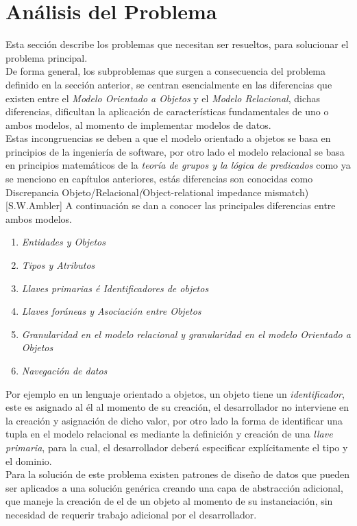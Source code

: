 \section{Análisis del Problema}
\noindent Esta sección describe los problemas que necesitan ser resueltos, para solucionar el problema principal.\\
\indent De forma general, los subproblemas que surgen a consecuencia del problema definido en la sección anterior,
\noindent se centran esencialmente en las diferencias que existen entre el \textit{Modelo Orientado a Objetos} y el
\noindent \textit{Modelo Relacional}, dichas diferencias, dificultan la aplicación de características fundamentales
\noindent de uno o ambos modelos, al momento de implementar modelos de datos.\\
\noindent Estas incongruencias se deben a que el modelo orientado a objetos se basa en principios de la ingeniería
\noindent de software, por otro lado el modelo relacional se basa en principios matemáticos de la
\noindent \textit{teoría de grupos y la lógica de predicados} como ya se menciono en capítulos anteriores, estás diferencias
\noindent son conocidas como Discrepancia Objeto/Relacional\textit(Object-relational impedance mismatch)[S.W.Ambler]
\noindent A continuación se dan a conocer las principales diferencias entre ambos modelos.
\begin{enumerate}
    \item \textit{Entidades y Objetos}
    \item \textit{Tipos y Atributos}
    \item \textit{Llaves primarias é Identificadores de objetos}
    \item \textit{Llaves foráneas y Asociación entre Objetos}
    \item \textit{Granularidad en el modelo relacional y granularidad en el modelo Orientado a Objetos}
    \item \textit{Navegación de datos}
\end{enumerate}
\noindent Por ejemplo en un lenguaje orientado a objetos,
\noindent un objeto tiene un \textit{identificador}, este es asignado al él al momento de su creación, el desarrollador no
\noindent interviene en la creación y asignación de dicho valor, por otro lado la forma de identificar una tupla en el modelo
\noindent relacional es mediante la definición y creación de una \textit{llave primaria}, para la cual, el desarrollador deberá
\noindent especificar explícitamente el tipo y el dominio.\\ Para la solución de este problema existen patrones de diseño
\noindent de datos que pueden ser aplicados a una solución genérica creando una capa de abstracción adicional, que maneje
\noindent la creación de el  de un objeto al momento de su instanciación, sin necesidad de requerir
\noindent trabajo adicional por el desarrollador.
